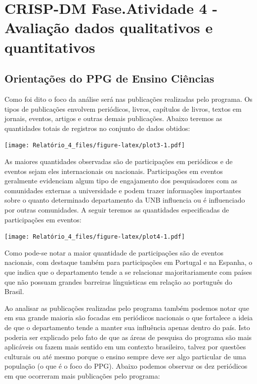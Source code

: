 \documentclass[]{article}
\begin{document}
\section{CRISP-DM Fase.Atividade 4 - Avaliação dados qualitativos e
quantitativos}\label{crisp-dm-fase.atividade-4---avaliacao-dados-qualitativos-e-quantitativos}

\subsection{Orientações do PPG de Ensino
Ciências}\label{orientacoes-do-ppg-de-ensino-ciencias}

Como foi dito o foco da análise será nas publicações realizadas pelo
programa. Os tipos de publicações envolvem periódicos, livros, capítulos
de livros, textos em jornais, eventos, artigos e outras demais
publicações. Abaixo teremos as quantidades totais de registros no
conjunto de dados obtidos:

\texttt{[image: Relatório\_4\_files/figure-latex/plot3-1.pdf]}

As maiores quantidades observadas são de participações em periódicos e
de eventos sejam eles internacionais ou nacionais. Participações em
eventos geralmente evidenciam algum tipo de engajamento dos
pesquisadores com as comunidades externas a universidade e podem trazer
informações importantes sobre o quanto determinado departamento da UNB
influencia ou é influenciado por outras comunidades. A seguir teremos as
quantidades especificadas de participações em eventos:

\texttt{[image: Relatório\_4\_files/figure-latex/plot4-1.pdf]}

Como pode-se notar a maior quantidade de participações são de eventos
nacionais, com destaque também para participações em Portugal e na
Espanha, o que indica que o departamento tende a se relacionar
majoritariamente com países que não possuam grandes barreiras
línguisticas em relação ao português do Brasil.

Ao analisar as publicações realizadas pelo programa também podemos notar
que em sua grande maioria são focadas em periódicos nacionais o que
fortalece a ideia de que o departamento tende a manter sua influência
apenas dentro do país. Isto poderia ser explicado pelo fato de que as
áreas de pesquisa do programa são mais aplicáveis ou fazem mais sentido
em um contexto brasileiro, talvez por questões culturais ou até mesmo
porque o ensino sempre deve ser algo particular de uma população (o que
é o foco do PPG). Abaixo podemos observar os dez periódicos em que
ocorreram mais publicações pelo programa:
\end{document}
